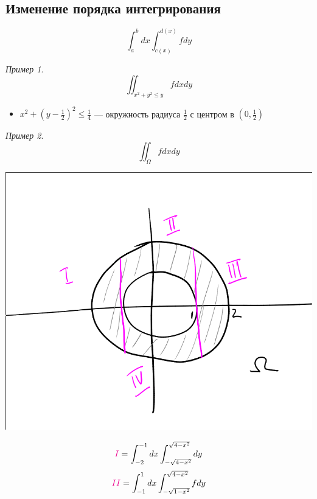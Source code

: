 \documentclass[english]{article}
\theoremstyle{plain}
\theoremstyle{remark}
\newtheorem*{examp}{Пример}
\theoremstyle{definition}
\begin{document}
\subsection{Изменение порядка интегрирования}
\label{sec:org219a4b2}
\[ \int_a^b dx \int^{d(x)}_{c(x)} f dy  \]
\begin{examp}
\[ \iint_{x^2 + y^2 \le y} f dx dy \]
\begin{itemize}
\item \(x^2 + (y - \frac{1}{2})^2 \le \frac{1}{4}\) --- окружность радиуса \(\frac{1}{2}\) с центром в \((0, \frac{1}{2})\)
\end{itemize}
\end{examp}
\begin{examp}
\[ \iint_\Omega f dx dy \]
\begin{center}
\includegraphics[scale=0.35]{2_4.png}
\end{center}
\[ \color{magenta}I\color{black} = \int^{-1}_{-2} dx \int^{\sqrt{4 - x^2}}_{-\sqrt{4 - x^2}} dy \]
\[ \color{magenta}II\color{black} = \int^1_{-1}dx\int^{\sqrt{4 - x^2}}_{-\sqrt{1 - x^2}} f dy \]
\end{examp}
\end{document}
